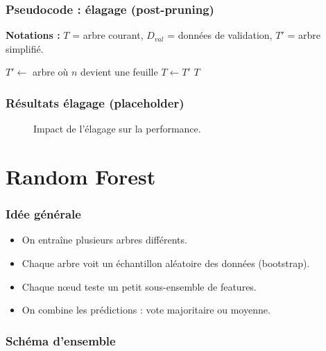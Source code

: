 \documentclass{beamer}
\begin{document}
\begin{frame}
	\frametitle{Pseudocode : élagage (post-pruning)}
	\scriptsize
	\textbf{Notations :} $T$ = arbre courant,\; $D_{val}$ = données de validation,\; $T'$ = arbre simplifié.\\
	\vspace{0.3em}
	\begin{algorithm}[H]
	\caption{Post-pruning (version simple)}
	\begin{algorithmic}[1]
				\State $T' \gets$ arbre où $n$ devient une feuille
					\State $T \gets T'$
				\EndIf
			\EndFor
			\State \Return $T$
		\EndProcedure
	\end{algorithmic}
	\end{algorithm}
\end{frame}

\begin{frame}
	\frametitle{Résultats élagage (placeholder)}
	\begin{figure}
		\centering
		\caption{Impact de l'élagage sur la performance.}
	\end{figure}
\end{frame}

\section{Random Forest}

\begin{frame}
	\frametitle{Idée générale}
	\begin{itemize}
		\item On entraîne plusieurs arbres différents.
		\item Chaque arbre voit un échantillon aléatoire des données (bootstrap).
		\item Chaque nœud teste un petit sous-ensemble de features.
		\item On combine les prédictions : vote majoritaire ou moyenne.
	\end{itemize}
\end{frame}

\begin{frame}
	\frametitle{Schéma d'ensemble}
	\begin{figure}
		\centering
	\end{figure}
\end{frame}
\end{document}

